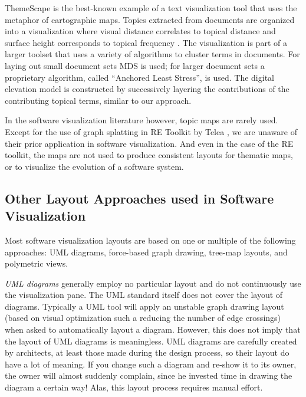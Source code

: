 ThemeScape is the best-known example of a text visualization tool that uses the metaphor of cartographic maps. 
Topics extracted from documents are organized into a visualization where visual distance correlates to topical distance and surface height corresponds to topical frequency \cite{Wise95b}. The visualization is part of a larger toolset that uses a variety of algorithms to cluster terms in documents. For laying out small document sets MDS is used; for larger document sets a proprietary algorithm, called ``Anchored Least Stress'', is used. The digital elevation model is constructed by successively layering the contributions of the contributing topical terms, similar to our approach.

In the software visualization literature however, topic maps are rarely used.
Except for the use of graph splatting in RE Toolkit by Telea \etal \cite{Tele03a}, we are unaware of their prior application in software visualization. And even in the case of the RE toolkit, the maps are not used to produce consistent layouts for thematic maps, or to visualize the evolution of a software system. 


\subsection{Other Layout Approaches used in Software Visualization}

Most software visualization layouts are based on one or multiple of the following approaches: UML diagrams, force-based graph drawing, tree-map layouts, and polymetric views.

\emph{UML diagrams} generally employ no particular layout and do not continuously use the visualization pane. The UML standard itself does not cover the layout of diagrams. Typically a UML tool will apply an unstable graph drawing layout (\eg based on visual optimization such a reducing the number of edge crossings) when asked to automatically layout a diagram. However, this does not imply that the layout of UML diagrams is meaningless. UML diagrams are carefully created by architects, at least those made during the design process, so their layout do have a lot of meaning. If you change such a diagram and re-show it to its owner, the owner will almost suddenly complain, since he invested time in drawing the diagram a certain way! Alas, this layout process requires manual effort.

